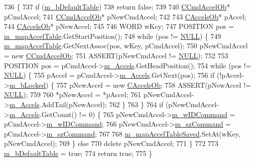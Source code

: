 \begin{DoxyCode}
736 \{
737   \textcolor{keywordflow}{if} (\mbox{\hyperlink{class_c_accelerator_manager_ac563baf2a7cedb91bc44e9b8581a6020}{m\_bDefaultTable}})
738     \textcolor{keywordflow}{return} \textcolor{keyword}{false};
739         
740   \mbox{\hyperlink{class_c_cmd_accel_ob}{CCmdAccelOb}}* pCmdAccel;
741   \mbox{\hyperlink{class_c_cmd_accel_ob}{CCmdAccelOb}}* pNewCmdAccel;
742 
743   \mbox{\hyperlink{class_c_accels_ob}{CAccelsOb}}* pAccel;
744   \mbox{\hyperlink{class_c_accels_ob}{CAccelsOb}}* pNewAccel;
745 
746   WORD wKey;
747   POSITION pos = \mbox{\hyperlink{class_c_accelerator_manager_a16b8d3e9328bc0eeeb048630deff2768}{m\_mapAccelTable}}.GetStartPosition();
748   \textcolor{keywordflow}{while} (pos != \mbox{\hyperlink{getopt1_8c_a070d2ce7b6bb7e5c05602aa8c308d0c4}{NULL}}) \{
749     \mbox{\hyperlink{class_c_accelerator_manager_a16b8d3e9328bc0eeeb048630deff2768}{m\_mapAccelTable}}.GetNextAssoc(pos, wKey, pCmdAccel);
750     pNewCmdAccel = \textcolor{keyword}{new} \mbox{\hyperlink{class_c_cmd_accel_ob}{CCmdAccelOb}};
751     ASSERT(pNewCmdAccel != \mbox{\hyperlink{getopt1_8c_a070d2ce7b6bb7e5c05602aa8c308d0c4}{NULL}});
752     
753     POSITION pos = pCmdAccel->\mbox{\hyperlink{class_c_cmd_accel_ob_a85772f1ea9204af42b8a39a0135dc0f8}{m\_Accels}}.GetHeadPosition();
754     \textcolor{keywordflow}{while} (pos != \mbox{\hyperlink{getopt1_8c_a070d2ce7b6bb7e5c05602aa8c308d0c4}{NULL}}) \{
755       pAccel = pCmdAccel->\mbox{\hyperlink{class_c_cmd_accel_ob_a85772f1ea9204af42b8a39a0135dc0f8}{m\_Accels}}.GetNext(pos);
756       \textcolor{keywordflow}{if} (!pAccel->\mbox{\hyperlink{class_c_accels_ob_ad8300bd20bd429ad61f89700e388dd9a}{m\_bLocked}}) \{
757         pNewAccel = \textcolor{keyword}{new} \mbox{\hyperlink{class_c_accels_ob}{CAccelsOb}};
758         ASSERT(pNewAccel != \mbox{\hyperlink{getopt1_8c_a070d2ce7b6bb7e5c05602aa8c308d0c4}{NULL}});
759   
760         *pNewAccel = *pAccel;
761         pNewCmdAccel->\mbox{\hyperlink{class_c_cmd_accel_ob_a85772f1ea9204af42b8a39a0135dc0f8}{m\_Accels}}.AddTail(pNewAccel);
762       \}
763     \}
764     \textcolor{keywordflow}{if} (pNewCmdAccel->\mbox{\hyperlink{class_c_cmd_accel_ob_a85772f1ea9204af42b8a39a0135dc0f8}{m\_Accels}}.GetCount() != 0) \{
765       pNewCmdAccel->\mbox{\hyperlink{class_c_cmd_accel_ob_aa3eb02dcd39ff14763fdefd8fabd7591}{m\_wIDCommand}} = pCmdAccel->\mbox{\hyperlink{class_c_cmd_accel_ob_aa3eb02dcd39ff14763fdefd8fabd7591}{m\_wIDCommand}};
766       pNewCmdAccel->\mbox{\hyperlink{class_c_cmd_accel_ob_acbd02cc68d3909b1e39b687e76f45d91}{m\_szCommand}} = pCmdAccel->\mbox{\hyperlink{class_c_cmd_accel_ob_acbd02cc68d3909b1e39b687e76f45d91}{m\_szCommand}};
767       
768       \mbox{\hyperlink{class_c_accelerator_manager_ad7c3ac9a16b8f19e0b5524d8582a5fae}{m\_mapAccelTableSaved}}.SetAt(wKey, pNewCmdAccel);
769     \} \textcolor{keywordflow}{else} 
770       \textcolor{keyword}{delete} pNewCmdAccel;
771   \}
772 
773   \mbox{\hyperlink{class_c_accelerator_manager_ac563baf2a7cedb91bc44e9b8581a6020}{m\_bDefaultTable}} = \textcolor{keyword}{true};
774   \textcolor{keywordflow}{return} \textcolor{keyword}{true};
775 \}
\end{DoxyCode}
